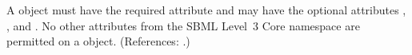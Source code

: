 A \ModifierSpeciesReference object must have the required attribute
 and may have the optional attributes ,
,  and .  No other attributes from the
SBML Level~3 Core namespace are permitted on a \ModifierSpeciesReference
object.  (References: .)
